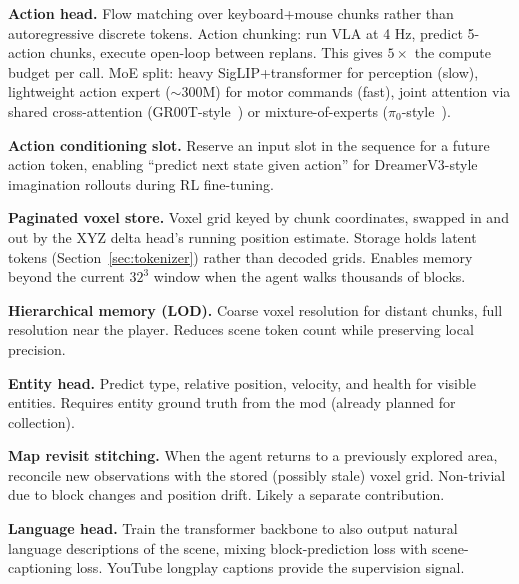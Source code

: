 \documentclass[11pt,a4paper]{article}
\begin{document}
\begin{futurework}
\textbf{Action head.} Flow matching over keyboard+mouse chunks rather than autoregressive discrete tokens. Action chunking: run VLA at 4 Hz, predict 5-action chunks, execute open-loop between replans. This gives $5\times$ the compute budget per call. MoE split: heavy SigLIP+transformer for perception (slow), lightweight action expert ($\sim$300M) for motor commands (fast), joint attention via shared cross-attention (GR00T-style~\cite{groot}) or mixture-of-experts ($\pi_0$-style~\cite{pi0}).
\end{futurework}

\begin{futurework}
\textbf{Action conditioning slot.} Reserve an input slot in the sequence for a future action token, enabling ``predict next state given action'' for DreamerV3-style imagination rollouts during RL fine-tuning.
\end{futurework}

\begin{futurework}
\textbf{Paginated voxel store.} Voxel grid keyed by chunk coordinates, swapped in and out by the XYZ delta head's running position estimate. Storage holds latent tokens (Section~\ref{sec:tokenizer}) rather than decoded grids. Enables memory beyond the current $32^3$ window when the agent walks thousands of blocks.
\end{futurework}

\begin{futurework}
\textbf{Hierarchical memory (LOD).} Coarse voxel resolution for distant chunks, full resolution near the player. Reduces scene token count while preserving local precision.
\end{futurework}

\begin{futurework}
\textbf{Entity head.} Predict type, relative position, velocity, and health for visible entities. Requires entity ground truth from the mod (already planned for collection).
\end{futurework}

\begin{futurework}
\textbf{Map revisit stitching.} When the agent returns to a previously explored area, reconcile new observations with the stored (possibly stale) voxel grid. Non-trivial due to block changes and position drift. Likely a separate contribution.
\end{futurework}

\begin{futurework}
\textbf{Language head.} Train the transformer backbone to also output natural language descriptions of the scene, mixing block-prediction loss with scene-captioning loss. YouTube longplay captions provide the supervision signal.
\end{futurework}
\end{document}
